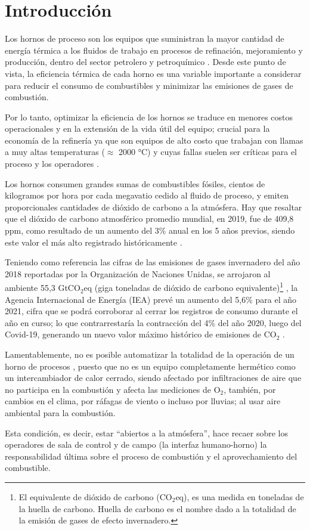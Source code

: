 \chapter*{Introducción}

\par Los hornos de proceso son los equipos que suministran la mayor cantidad de energía térmica a los fluidos de trabajo en procesos de refinación, mejoramiento y producción, dentro del sector petrolero y petroquímico \cite{bib:sandoval}. Desde este punto de vista, la eficiencia térmica de cada horno es una variable importante a considerar para reducir el consumo de combustibles y minimizar las emisiones de gases de combustión.

\par Por lo tanto, optimizar la eficiencia de los hornos se traduce en menores costos operacionales y en la extensión de la vida útil del equipo; crucial para la economía de la refinería ya que son equipos de alto costo que trabajan con llamas a muy altas temperaturas ($\approx$ 2000 °C) y cuyas fallas suelen ser críticas para el proceso y los operadores \cite{bib:economics}.

\par Los hornos consumen grandes sumas de combustibles fósiles, cientos de kilogramos por hora por cada megavatio cedido al fluido de proceso, y emiten proporcionales cantidades de dióxido de carbono a la atmósfera. Hay que resaltar que el dióxido de carbono atmosférico promedio mundial, en 2019, fue de 409,8 ppm, como resultado de un aumento del 3\% anual en los 5 años previos, siendo este valor el más alto registrado históricamente \cite{bib:clima}.
\par Teniendo como referencia las cifras de las emisiones de gases invernadero del año 2018 reportadas por la Organización de Naciones Unidas, se arrojaron al ambiente 55,3 GtCO$_2$eq (giga toneladas de dióxido de carbono equivalente)\footnote{El equivalente de dióxido de carbono (CO$_2$eq), es una medida en toneladas de la huella de carbono. Huella de carbono es el nombre dado a la totalidad de la emisión de gases de efecto invernadero.} \cite{onu}, la Agencia Internacional de Energía (IEA) prevé un aumento del 5,6\% para el año 2021, cifra que se podrá corroborar al cerrar los registros de consumo durante el año en curso; lo que contrarrestaría la contracción del 4\% del año 2020, luego del Covid-19, generando un nuevo valor máximo histórico de emisiones de CO$_2$ \cite{bib:iea}.

\par Lamentablemente, no es posible automatizar la totalidad de la operación de un horno de procesos \cite{bib:instrumentacion}, puesto que no es un equipo completamente hermético como un intercambiador de calor cerrado, siendo afectado por infiltraciones de aire que no participa en la combustión y afecta las mediciones de O$_2$, también, por cambios en el clima, por ráfagas de viento o incluso por lluvias; al usar aire ambiental para la combustión.
\par Esta condición, es decir, estar ``abiertos a la atmósfera'', hace recaer sobre los operadores de sala de control y de campo (la interfaz humano-horno) la responsabilidad última sobre el proceso de combustión y el aprovechamiento del combustible.

